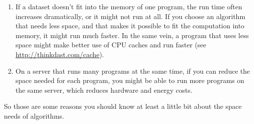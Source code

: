\documentclass[12pt]{book}
\theoremstyle{exercise}
\begin{document}
\begin{enumerate}

\item If a dataset doesn't fit into the memory of one program, the run
  time often increases dramatically, or it might not run at all. If you
  choose an algorithm that needs less space, and that makes it possible
  to fit the computation into memory, it might run much faster. In the
  same vein, a program that uses less space might make better use of
  CPU caches and run
  faster (see \url{http://thinkdast.com/cache}).

\item On a server that runs many programs at the same time, if you can
  reduce the space needed for each program, you might be able to run
  more programs on the same server, which reduces hardware and energy
  costs.

\end{enumerate}

So those are some reasons you should know at least a little bit about
the space needs of algorithms.



\backmatter
\printindex

\end{document}

